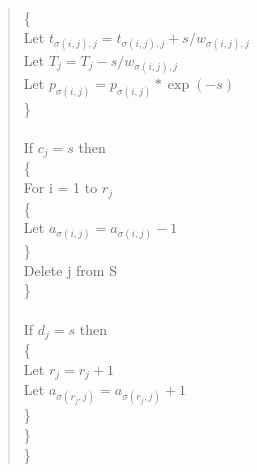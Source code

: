 \begin{quote}
       \hbox{\hspace{1cm}}\{\\
       \hbox{\hspace{15mm}}Let $t_{\sigma(i,j),j} = t_{\sigma(i,j),j} + s/w_{\sigma(i,j),j}$\\
       \hbox{\hspace{15mm}}Let $T_j = T_j - s/w_{\sigma(i,j),j}$\\
       \hbox{\hspace{15mm}}Let $p_{\sigma(i,j)} = p_{\sigma(i,j)}*\exp(-s)$\\
       \hbox{\hspace{1cm}}\}\\\\
       \hbox{\hspace{1cm}}If $c_j = s$ then\\
       \hbox{\hspace{1cm}}\{\\
       \hbox{\hspace{15mm}}For i = 1 to $r_j$\\
       \hbox{\hspace{15mm}}\{\\
       \hbox{\hspace{20mm}}Let $a_{\sigma(i,j)} = a_{\sigma(i,j)} - 1$\\
       \hbox{\hspace{15mm}}\}\\
       \hbox{\hspace{15mm}}Delete j from S\\
       \hbox{\hspace{1cm}}\}\\\\
       \hbox{\hspace{1cm}}If $d_j = s$ then\\
       \hbox{\hspace{1cm}}\{\\
       \hbox{\hspace{15mm}}Let $r_j = r_j + 1$\\
       \hbox{\hspace{15mm}}Let $a_{\sigma(r_j,j)} = a_{\sigma(r_j,j)} + 1$\\
       \hbox{\hspace{1cm}}\}\\
       \hbox{\hspace{5mm}}\}\\
\}
\end{quote}




